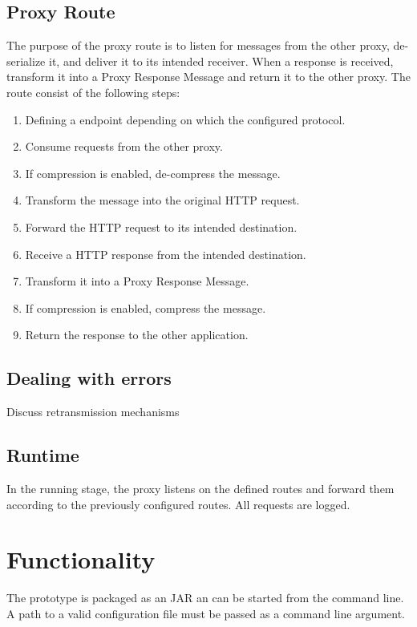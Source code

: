 \subsection{Proxy Route}

The purpose of the proxy route is to listen for messages from the other proxy,
de-serialize it, and deliver it to its intended receiver. When a response is
received, transform it into a Proxy Response Message and return it to the other proxy. The route consist of the following steps:

\begin{enumerate}
	\item Defining a endpoint depending on which the configured protocol.
	\item Consume requests from the other proxy.
	\item If compression is enabled, de-compress the message.
	\item Transform the message into the original HTTP request.
	\item Forward the HTTP request to its intended destination.
	\item Receive a HTTP response from the intended destination.
	\item Transform it into a Proxy Response Message.
	\item If compression is enabled, compress the message.
	\item Return the response to the other application.
\end{enumerate}

\subsection{Dealing with errors}

Discuss retransmission mechanisms

\subsection{Runtime}

In the running stage, the proxy listens on the defined routes and forward them according to the previously configured routes. All requests are logged.


\section{Functionality}

The prototype is packaged as an JAR an can be started from the command line. A path to a valid configuration file must be passed as a command line argument.


